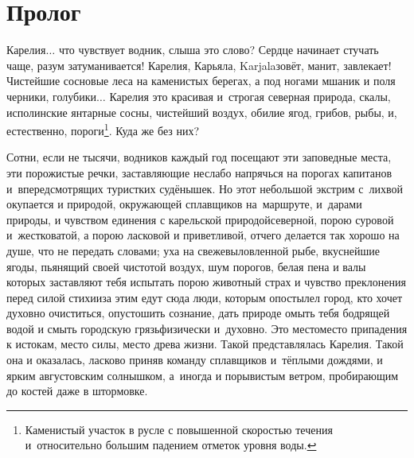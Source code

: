 {

{
\cleardoublepage
{}


\section*{Пролог}

\fancyhead[LE]{\fancyplain{}{}}
\fancyhead[RO]{\fancyplain{}{}}

Карелия$\ldots$ что чувствует водник, слыша это слово? Сердце начинает стучать чаще, разум затуманивается! Карелия, Карьяла, Karjala\mdash зовёт, манит, завлекает! Чистейшие сосновые леса на каменистых берегах, а под ногами мшаник и поля черники, голубики$\ldots$ Карелия это красивая и~строгая северная природа, скалы, исполинские янтарные сосны, чистейший воздух, обилие ягод, грибов, рыбы, и, естественно, пороги\footnote{Каменистый участок в русле с повышенной скоростью течения и~относительно большим падением отметок уровня воды.}. Куда же без них? 

Сотни, если не тысячи, водников каждый год посещают эти заповедные места, эти порожистые речки, заставляющие неслабо напрячься на порогах капитанов и~впередсмотрящих туристких судёнышек. Но этот небольшой экстрим с~лихвой окупается и природой, окружающей сплавщиков на~маршруте, и~дарами природы, и чувством единения с карельской природой\mdash северной, порою суровой и~жестковатой, а порою ласковой и приветливой, отчего делается так хорошо на душе, что не передать словами; уха на свежевыловленной рыбе, вкуснейшие ягоды, пьянящий своей чистотой воздух, шум порогов, белая пена и валы которых заставляют тебя испытать порою животный страх и чувство преклонения перед силой стихии\mdash за этим едут сюда люди, которым опостылел город, кто хочет духовно очиститься, опустошить сознание, дать природе омыть тебя бодрящей водой и смыть городскую грязь\mdash физически и~духовно. Это место\mdash место припадения к истокам, место силы, место древа жизни. Такой представлялась Карелия. Такой она и оказалась, ласково приняв команду сплавщиков и~тёплыми дождями, и ярким августовским солнышком, а~иногда и порывистым ветром, пробирающим до костей даже в штормовке.  

}}
